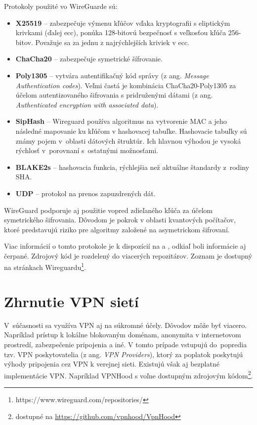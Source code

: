 Protokoly použité vo WireGuarde sú:
\begin{itemize}
	\item{\textbf{X25519}} \cite{x25519} -- zabezpečuje výmenu kľúčov vďaka kryptografii s eliptickým krivkami \cite{ecc} (ďalej \acrshort{ecc}), ponúka 128-bitovú bezpečnosť s veľkosťou kľúča 256-bitov. Považuje sa za jednu z najrýchlejších kriviek v \acrshort{ecc}.
	\item{\textbf{ChaCha20}} \cite{chacha} -- zabezpečuje symetrické šífrovanie.
	\item{\textbf{Poly1305}} \cite{poly} -- vytvára autentifikačný kód správy (z ang. \textit{Message Authentication codes}). Veľmi častá je kombinácia ChaCha20-Poly1305 za účelom autentizovaného šifrovania s pridruženými dátami (z ang. \textit{Authenticated encryption with associated data}).
	\item{\textbf{SipHash}} \cite{siphash} -- Wireguard používa algoritmus na vytvorenie MAC a jeho následné mapovanie ku kľúčom v hashovacej tabuľke. Hashovacie tabuľky sú známy pojem v~oblasti dátových štruktúr. Ich hlavnou výhodou je vysoká rýchlosť v~porovnaní s~ostatnými možnosťami.  
	\item{\textbf{BLAKE2s}} \cite{blake} -- hashovacia funkcia, rýchlejšia než aktuálne štandardy z~rodiny SHA. 
	\item{\textbf{UDP}} --  protokol na prenos zapuzdrených dát.
\end{itemize} 
WireGuard podporuje aj použitie vopred zdieľaného kľúča za účelom symetrického šifrovania. Dôvodom je pokrok v oblasti kvantových počítačov, ktoré predstavujú riziko pre algoritmy založené na asymetrickom šifrovaní.

Viac informácií o tomto protokole je k dispozícií na \cite{wireguard} a \cite{wireguardpdf}, odkiaľ boli informácie aj čerpané. Zdrojový kód je rozdelený do viacerých repozitárov. Zoznam je dostupný na stránkach Wireguardu\footnote{https://www.wireguard.com/repositories/}.
\section{Zhrnutie VPN sietí}
V~súčasnosti sa využíva VPN aj na súkromné účely. Dôvodov môže byť viacero. Napríklad prístup k lokálne blokovaným doménam, anonymita v internetovom prostredí, zabezpečenie pripojenia a iné. V tomto prípade vstupujú do~popredia tzv. VPN poskytovatelia (z ang. \textit{VPN Providers}), ktorý za poplatok poskytujú výhody pripojenia cez VPN k verejnej sieti. Existujú však aj bezplatné implementácie VPN. Napríklad VPNHood s voľne dostupným zdrojovým kódom\footnote{dostupné na \url{https://github.com/vpnhood/VpnHood}}. 

